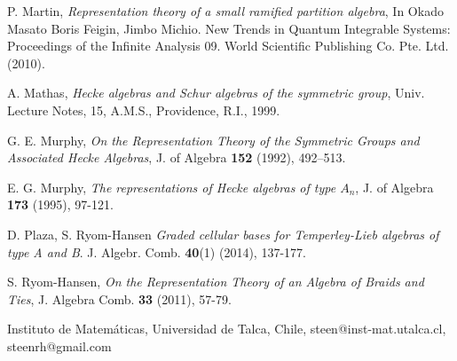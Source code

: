 \documentclass[10pt,a4,twoside,hidelinks,rm]{article}
\theoremstyle{plain}
\begin{document}
\begin{thebibliography}{99}
  
 P. Martin, \textit{Representation theory of a small ramified partition algebra}, In
Okado Masato Boris Feigin, Jimbo Michio.  New Trends in Quantum
Integrable Systems: Proceedings of the Infinite Analysis 09. World Scientific
Publishing Co. Pte. Ltd. (2010).


 A. Mathas,
\textit{Hecke algebras and Schur algebras of the symmetric group},
Univ. Lecture Notes, 15, A.M.S., Providence, R.I., 1999.


 G. E. Murphy, {\it On the Representation Theory of the 
Symmetric
Groups and Associated Hecke Algebras}, J. of Algebra {\bf 152} (1992),
492--513.


 E. G. Murphy,
\textit{The representations of Hecke algebras of type $A_n$}, J. of
Algebra {\bf 173} (1995), 97-121.


D. Plaza,  S. Ryom-Hansen
\textit{Graded cellular bases for Temperley-Lieb algebras of type A and B}. 
J. Algebr. Comb. {\bf 40}(1) (2014), 137-177.





 S. Ryom-Hansen,
\textit{On the Representation Theory of an Algebra of Braids and
Ties}, J. Algebra Comb. {\bf 33} (2011), 57-79.


\end{thebibliography}

\noindent
\sc Instituto de Matem\'aticas, Universidad de Talca, Chile,
steen@inst-mat.utalca.cl, steenrh@gmail.com
\end{document}
